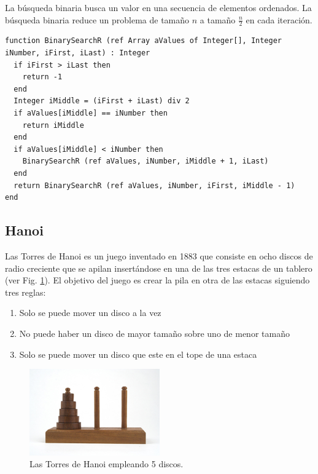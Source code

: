 La búsqueda binaria busca un valor en una secuencia de elementos ordenados. La búsqueda binaria reduce un problema de tamaño $n$ a tamaño $\frac{n}{2}$ en cada iteración.

\begin{lstlisting}[upquote=true, language=pseudo]
function BinarySearchR (ref Array aValues of Integer[], Integer iNumber, iFirst, iLast) : Integer
  if iFirst > iLast then
    return -1
  end
  Integer iMiddle = (iFirst + iLast) div 2
  if aValues[iMiddle] == iNumber then
    return iMiddle
  end
  if aValues[iMiddle] < iNumber then
    BinarySearchR (ref aValues, iNumber, iMiddle + 1, iLast)
  end
  return BinarySearchR (ref aValues, iNumber, iFirst, iMiddle - 1)
end
\end{lstlisting}

\subsection{Hanoi}
	Las Torres de Hanoi es un juego inventado en 1883 que consiste en ocho discos de radio creciente que se apilan insertándose en una de las tres estacas de un tablero (ver Fig. \ref{fig:Ch1hanoi}). El objetivo del juego es crear la pila en otra de las estacas siguiendo tres reglas:
\begin{enumerate}
\item Solo se puede mover un disco a la vez
\item No puede haber un disco de mayor tamaño sobre uno de menor tamaño
\item Solo se puede mover un disco que este en el tope de una estaca
\end{enumerate}

\begin{figure}[htpb!]
  \begin{center}
    \includegraphics[width=0.5\textwidth]{images/hanoi.jpg}
  \end{center}
  \caption{Las Torres de Hanoi empleando 5 discos.}
  \label{fig:Ch1hanoi}
\end{figure}

